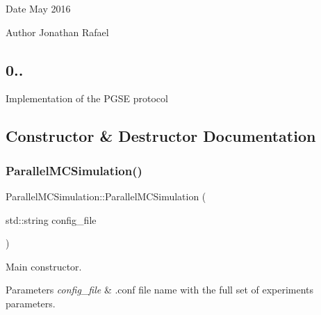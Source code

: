 \begin{DoxyDate}{Date}
May 2016 
\end{DoxyDate}
\begin{DoxyAuthor}{Author}
Jonathan Rafael \subsection*{0.. }
\end{DoxyAuthor}


Implementation of the P\+G\+SE protocol 

\subsection{Constructor \& Destructor Documentation}
\mbox{\label{class_parallel_m_c_simulation_ac85dc215688a1462b770d20c2ff10b3f}} 
\subsubsection{\texorpdfstring{Parallel\+M\+C\+Simulation()}{ParallelMCSimulation()}\hspace{0.1cm}{\footnotesize\ttfamily [1/2]}}
{\footnotesize\ttfamily Parallel\+M\+C\+Simulation\+::\+Parallel\+M\+C\+Simulation (\begin{DoxyParamCaption}\item[{std\+::string}]{config\+\_\+file }\end{DoxyParamCaption})}



Main constructor. 


\begin{DoxyParams}{Parameters}
{\em config\+\_\+file} & .conf file name with the full set of experiments parameters. \\
\hline
\end{DoxyParams}
\mbox{\label{class_parallel_m_c_simulation_a32ee405791787a1ea9d03895fdd810f4}} 

